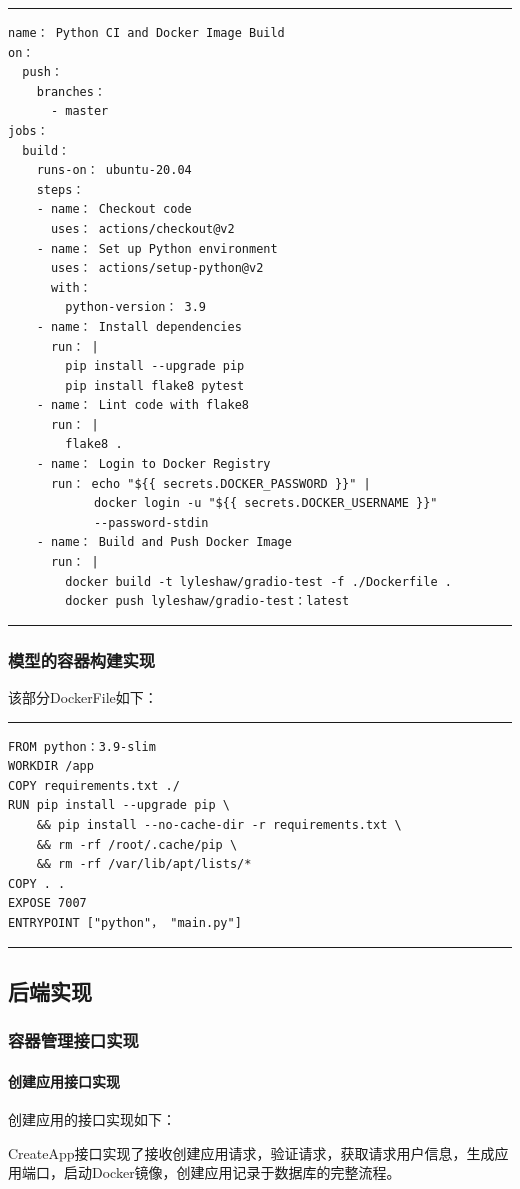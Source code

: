 \documentclass{HDU-Bachelor-Thesis}
\begin{document}
{\noindent}\rule[0pt]{15cm}{0.05em}
\begin{verbatim}
name： Python CI and Docker Image Build
on：
  push：
    branches：
      - master
jobs：
  build：
    runs-on： ubuntu-20.04
    steps：
    - name： Checkout code
      uses： actions/checkout@v2
    - name： Set up Python environment
      uses： actions/setup-python@v2
      with：
        python-version： 3.9
    - name： Install dependencies
      run： |
        pip install --upgrade pip
        pip install flake8 pytest
    - name： Lint code with flake8
      run： |
        flake8 .
    - name： Login to Docker Registry
      run： echo "${{ secrets.DOCKER_PASSWORD }}" | 
            docker login -u "${{ secrets.DOCKER_USERNAME }}" 
            --password-stdin
    - name： Build and Push Docker Image
      run： |
        docker build -t lyleshaw/gradio-test -f ./Dockerfile .
        docker push lyleshaw/gradio-test：latest
\end{verbatim}
{\noindent}\rule[0pt]{15cm}{0.05em}

\subsubsection{模型的容器构建实现}

该部分DockerFile如下：

{\noindent}\rule[0pt]{15cm}{0.05em}
\begin{verbatim}
FROM python：3.9-slim
WORKDIR /app
COPY requirements.txt ./
RUN pip install --upgrade pip \
    && pip install --no-cache-dir -r requirements.txt \
    && rm -rf /root/.cache/pip \
    && rm -rf /var/lib/apt/lists/*
COPY . .
EXPOSE 7007
ENTRYPOINT ["python"， "main.py"]
\end{verbatim}
{\noindent}\rule[0pt]{15cm}{0.05em}

\subsection{后端实现}
\subsubsection{容器管理接口实现}
\paragraph{创建应用接口实现}

创建应用的接口实现如下：

CreateApp接口实现了接收创建应用请求，验证请求，获取请求用户信息，生成应用端口，启动Docker镜像，创建应用记录于数据库的完整流程。
\end{document}
